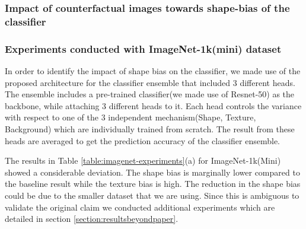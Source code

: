 \subsubsection{Impact of counterfactual images towards shape-bias of the classifier}

\subsubsection{Experiments conducted with ImageNet-1k(mini) dataset}
\label{section:textshapebg}

In order to identify the impact of shape bias on the classifier, we made use of the proposed architecture for the classifier ensemble that included 3 different heads. The ensemble includes a pre-trained classifier(we made use of Resnet-50) as the backbone, while attaching 3 different heads to it. Each head controls the variance with respect to one of the 3 independent mechanism(Shape, Texture, Background) which are individually trained from scratch. The result from these heads are averaged to get the prediction accuracy of the classifier ensemble.

The results in Table \ref{table:imagenet-experiments}(a) for ImageNet-1k(Mini) showed a considerable deviation. The shape bias is marginally lower compared to the baseline result while the texture bias is high. The reduction in the shape bias could be due to the smaller dataset that we are using. Since this is ambiguous to validate the original claim we conducted additional experiments which are detailed in section \ref{section:resultsbeyondpaper}. 


